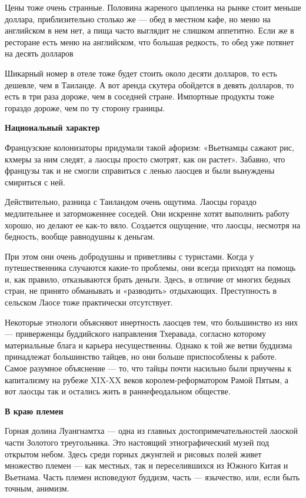 \begin{fancyquotes}
    Цены тоже очень странные. Половина жареного цыпленка на рынке стоит меньше доллара, приблизительно столько же — обед в местном кафе, но меню на английском в нем нет, а пища часто выглядит не слишком аппетитно. Если же в ресторане есть меню на английском, что большая редкость, то обед уже потянет на десять долларов
\end{fancyquotes}

Шикарный номер в отеле тоже будет стоить около десяти долларов, то есть дешевле, чем в Таиланде. А вот аренда скутера обойдется в девять долларов, то есть в три раза дороже, чем в соседней стране. Импортные продукты тоже гораздо дороже, чем по ту сторону границы.

\textbf{Национальный характер}

Французские колонизаторы придумали такой афоризм: «Вьетнамцы сажают рис, кхмеры за ним следят, а лаосцы просто смотрят, как он растет». Забавно, что французы так и не смогли справиться с ленью лаосцев и были вынуждены смириться с ней.

Действительно, разница с Таиландом очень ощутима. Лаосцы гораздо медлительнее и заторможеннее соседей. Они искренне хотят выполнить работу хорошо, но делают ее как-то вяло. Создается ощущение, что лаосцы, несмотря на бедность, вообще равнодушны к деньгам.

При этом они очень добродушны и приветливы с туристами. Когда у путешественника случаются какие-то проблемы, они всегда приходят на помощь и, как правило, отказываются брать деньги. Здесь, в отличие от многих бедных стран, не принято обманывать и «разводить» отдыхающих. Преступность в сельском Лаосе тоже практически отсутствует.

Некоторые этнологи объясняют инертность лаосцев тем, что большинство из них — приверженцы буддийского направления Тхеравада, согласно которому материальные блага и карьера несущественны. Однако к той же ветви буддизма принадлежат большинство тайцев, но они больше приспособлены к работе. Самое разумное объяснение — то, что тайцы почти насильно были приучены к капитализму на рубеже XIX-XX веков королем-реформатором Рамой Пятым, а вот лаосцы так и остались жить в раннефеодальном обществе.

\textbf{В краю племен}

Горная долина Луангнамтха — одна из главных достопримечательностей лаоской части Золотого треугольника. Это настоящий этнографический музей под открытом небом. Здесь среди горных джунглей и рисовых полей живет множество племен — как местных, так и переселившихся из Южного Китая и Вьетнама. Часть племен исповедуют буддизм, часть — язычество, или, если быть точным, анимизм.

